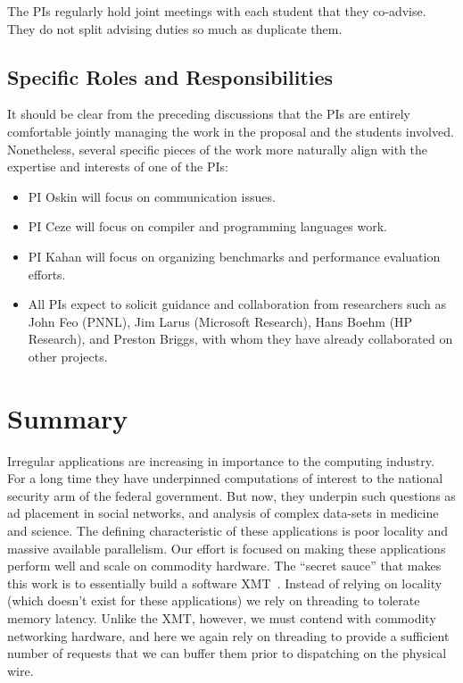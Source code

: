 The PIs regularly hold joint meetings with each student that they
co-advise.  They do not split advising duties so much as duplicate
them.

\subsection*{Specific Roles and Responsibilities}

It should be clear from the preceding discussions that the PIs are
entirely comfortable jointly managing the work in the proposal and the
students involved.  Nonetheless, several specific pieces of the work
more naturally align with the expertise and interests of one of the
PIs:

\begin{itemize}
\item PI Oskin will focus on communication issues. 
\item PI Ceze will focus on compiler and programming languages work.
\item PI Kahan will focus on organizing benchmarks and performance evaluation efforts.
\item All PIs expect to solicit guidance and collaboration from
  researchers such as John Feo (PNNL), Jim Larus (Microsoft Research), Hans
  Boehm (HP Research), and Preston Briggs,  with whom
  they have already collaborated on other projects.
\end{itemize}

\section{Summary}

Irregular applications are increasing in importance to the computing industry.  For a long time they have underpinned computations of interest to the national security arm of the federal government.  But now, they underpin such questions as ad placement in social networks, and analysis of complex data-sets in medicine and science.  The defining characteristic of these applications is poor locality and massive available parallelism.  Our effort is focused on making these applications perform well and scale on commodity hardware.  The ``secret sauce'' that makes this work is to essentially build a software XMT~\cite{feo:xmt}.  Instead of relying on locality (which doesn't exist for these applications) we rely on threading to tolerate memory latency.  Unlike the XMT, however, we must contend with commodity networking hardware, and here we again rely on threading to provide a sufficient number of requests that we can buffer them prior to dispatching on the physical wire.

